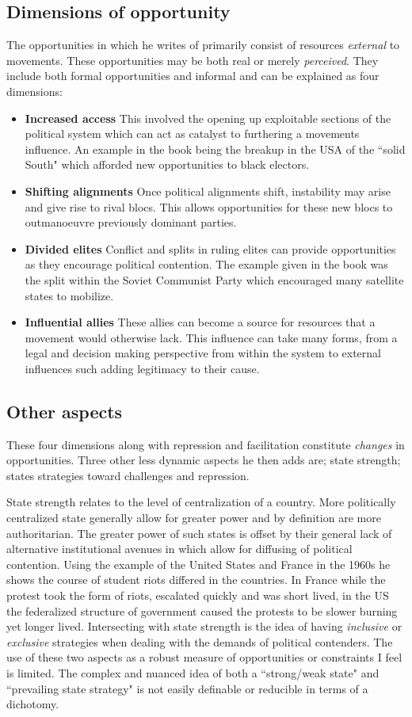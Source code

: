 \documentclass[12pt, a4paper]{article}
\begin{document}
\subsection*{Dimensions of opportunity}
The opportunities in which he writes of primarily consist of resources \emph{external} to movements. These opportunities may be both real or merely \emph{perceived}. They include both formal opportunities and informal and can be explained as four dimensions:
\begin{itemize}
\item \textbf{Increased access} This involved the opening up exploitable sections of the political system which can act as catalyst to furthering a movements influence. An example in the book being the breakup in the USA of the ``solid South" which afforded new opportunities to black electors.
\item \textbf{Shifting alignments} Once political alignments shift, instability may arise and give rise to rival blocs. This allows opportunities for these new blocs to outmanoeuvre previously dominant parties.  
\item \textbf{Divided elites} Conflict and splits in ruling elites can provide opportunities as they encourage political contention. The example given in the book was the split within the Soviet Communist Party which encouraged many satellite states to mobilize.
\item \textbf{Influential allies} These allies can become a source for resources that a movement would otherwise lack. This influence can take many forms, from a legal and decision making perspective from within the system to external influences such adding legitimacy to their cause.
\end{itemize}
\subsection*{Other aspects}
These four dimensions along with repression and facilitation constitute \emph{changes} in opportunities. Three other less dynamic aspects he then adds are; state strength; states strategies toward challenges and repression.  

State strength relates to the level of centralization of a country. More politically centralized state generally allow for greater power and by definition are more authoritarian. The greater power of such states is offset by their general lack of alternative institutional avenues in which allow for diffusing of political contention. Using the example of the United States and France in the 1960s he shows the course of student riots differed in the countries. In France while the protest took the form of riots, escalated quickly and was short lived, in the US the federalized structure of government caused the protests to be slower burning yet longer lived. Intersecting with state strength is the idea of having \emph{inclusive} or \emph{exclusive} strategies when dealing with the demands of political contenders. The use of these two aspects as a robust measure of opportunities or constraints I feel is limited. The complex and nuanced idea of both a ``strong/weak state" and ``prevailing state strategy" is not easily definable or reducible in terms of a dichotomy. 
\end{document}
